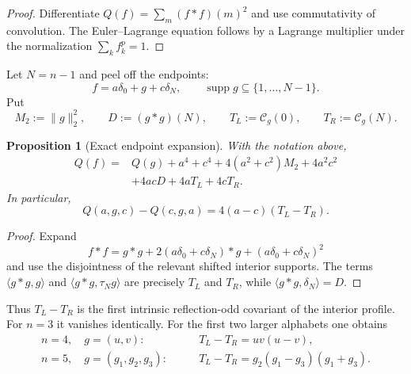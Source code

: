 \documentclass[11pt,reqno]{amsart}
\numberwithin{equation}{section}
\newtheorem{proposition}[proposition]{Proposition}
\theoremstyle{definition}
\theoremstyle{remark}
\newcommand{\supp}{\operatorname{supp}}
\newcommand{\norm}[1]{\lVert #1\rVert}
\newcommand{\ip}[2]{\langle #1,#2\rangle}
\newcommand{\cC}{\mathcal C}
\begin{document}
\begin{proof}
Differentiate
$Q(f)=\sum_m(f*f)(m)^2$ and use commutativity of convolution.  The
Euler--Lagrange equation follows by a Lagrange multiplier under the
normalization $\sum_k f_k^p=1$.
\end{proof}

Let $N=n-1$ and peel off the endpoints:
\begin{equation}\label{eq:endpoint-peel}
  f=a\delta_0+g+c\delta_N,
  \qquad \supp g\subseteq\{1,\ldots,N-1\}.
\end{equation}
Put
\begin{equation}\label{eq:endpoint-data}
  M_2:=\norm g_2^2,
  \qquad
  D:=(g*g)(N),
  \qquad
  T_L:=\cC_g(0),
  \qquad
  T_R:=\cC_g(N).
\end{equation}

\begin{proposition}[Exact endpoint expansion]\label{prop:endpoint-expansion}
With the notation above,
\begin{equation}\label{eq:endpoint-expansion}
\begin{aligned}
  Q(f)={}&Q(g)+a^4+c^4+4(a^2+c^2)M_2+4a^2c^2\\
        &+4acD+4aT_L+4cT_R.
\end{aligned}
\end{equation}
In particular,
\begin{equation}\label{eq:orientation-defect}
  Q(a,g,c)-Q(c,g,a)=4(a-c)(T_L-T_R).
\end{equation}
\end{proposition}

\begin{proof}
Expand
\[
  f*f=g*g+2(a\delta_0+c\delta_N)*g
      +(a\delta_0+c\delta_N)^2
\]
and use the disjointness of the relevant shifted interior supports.  The
terms $\ip{g*g}{g}$ and $\ip{g*g}{\tau_Ng}$ are precisely $T_L$ and
$T_R$, while $\ip{g*g}{\delta_N}=D$.
\end{proof}

Thus $T_L-T_R$ is the first intrinsic reflection-odd covariant of the
interior profile.  For $n=3$ it vanishes identically.  For the first two
larger alphabets one obtains
\begin{equation}\label{eq:defect-n4n5}
\begin{aligned}
  n=4,\quad g=(u,v):&\qquad T_L-T_R=uv(u-v),\\
  n=5,\quad g=(g_1,g_2,g_3):&\qquad
  T_L-T_R=g_2(g_1-g_3)(g_1+g_3).
\end{aligned}
\end{equation}
\end{document}
